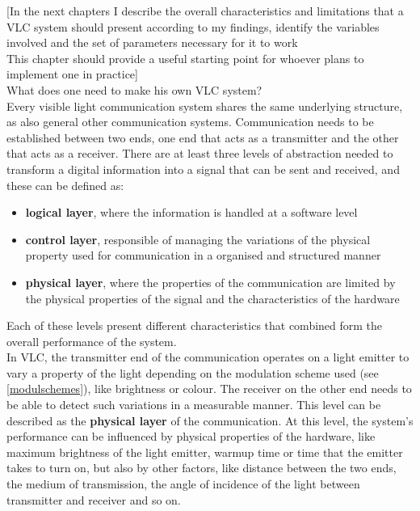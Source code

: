 
[In the next chapters I describe the overall characteristics and limitations that a VLC system should present according to my findings, identify the variables involved and the set of parameters necessary for it to work\\
This chapter should provide a useful starting point for whoever plans to implement one in practice]\\
What does one need to make his own VLC system?\\


Every visible light communication system shares the same underlying structure, as also general other communication systems.
Communication needs to be established between two ends, one end that acts as a transmitter and the other that acts as a receiver.
There are at least three levels of abstraction needed to transform a digital information into a signal that can be sent and received, and these can be defined as: 
\begin{itemize}
\item \textbf{logical layer}, where the information is handled at a software level
\item \textbf{control layer}, responsible of managing the variations of the physical property used for communication in a organised and structured manner
\item \textbf{physical layer}, where the properties of the communication are limited by the physical properties of the signal and the characteristics of the hardware
\end{itemize}
Each of these levels present different characteristics that combined form the overall performance of the system.\\

In VLC, the transmitter end of the communication operates on a light emitter to vary a property of the light depending on the modulation scheme used (see \ref{modulschemes}), like brightness or colour.
The receiver on the other end needs to be able to detect such variations in a measurable manner.
This level can be described as the \textbf{physical layer} of the communication.
At this level, the system's performance can be influenced by physical properties of the hardware, like maximum brightness of the light emitter, warmup time or time that the emitter takes to turn on, but also by other factors, like distance between the two ends, the medium of transmission, the angle of incidence of the light between transmitter and receiver and so on.\\

